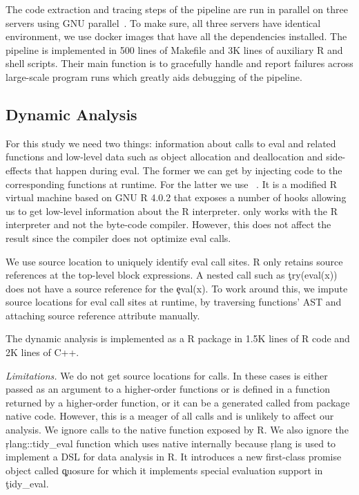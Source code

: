 \documentclass[acmsmall]{acmart}
\newcommand{\mypara}[1]{\medskip\noindent\emph{#1}\xspace}
\begin{document}
The code extraction and tracing steps of the pipeline are run in parallel on
three servers using GNU parallel~\cite{GNUparallel}. To make sure, all three
servers have identical environment, we use docker images that have all the
dependencies installed. The pipeline is implemented in 500 lines of Makefile and
3K lines of auxiliary R and shell scripts. Their main function is to gracefully
handle and report failures across large-scale program runs which greatly aids
debugging of the pipeline.

\subsection{Dynamic Analysis}

For this study we need two things: information about calls to eval and related
functions and low-level data such as object allocation and deallocation and
side-effects that happen during eval. The former we can get by injecting code to
the corresponding functions at runtime. For the latter we use
\rdyntrace~\cite{oopsla19a}. It is a modified R virtual machine based on
GNU R 4.0.2 that exposes a number of hooks allowing us to get low-level
information about the R interpreter. \rdyntrace only works with the R
interpreter and not the byte-code compiler. However, this does not affect the
result since the compiler does not optimize eval calls.

We use source location to uniquely identify eval call sites. R only retains
source references at the top-level block expressions. A nested call such as
\c{try(eval(x))} does not have a source reference for the \c{eval(x)}. To work
around this, we impute source locations for eval call sites at runtime, by
traversing functions' AST and attaching source reference attribute manually.

The dynamic analysis is implemented as a R package in 1.5K lines of R code and
2K lines of C++.

\mypara{Limitations.}
%
%
We do not get source locations for \CranUndefinedRnd \eval calls. In
these cases \eval is either passed as an argument to a higher-order functions or
is defined in a function returned by a higher-order function, or it can be a
generated called from package native code. However, this is a meager
\CranUndefinedRatio of all \eval calls and is unlikely to affect our
analysis. We ignore calls to the native \eval function exposed by R. We also
ignore the \c{rlang::tidy_eval} function which uses native \eval internally
because \c{rlang} is used to implement a DSL for data analysis in R. It
introduces a new first-class promise object called \c{quosure} for which it
implements special evaluation support in \c{tidy_eval}.
\end{document}
